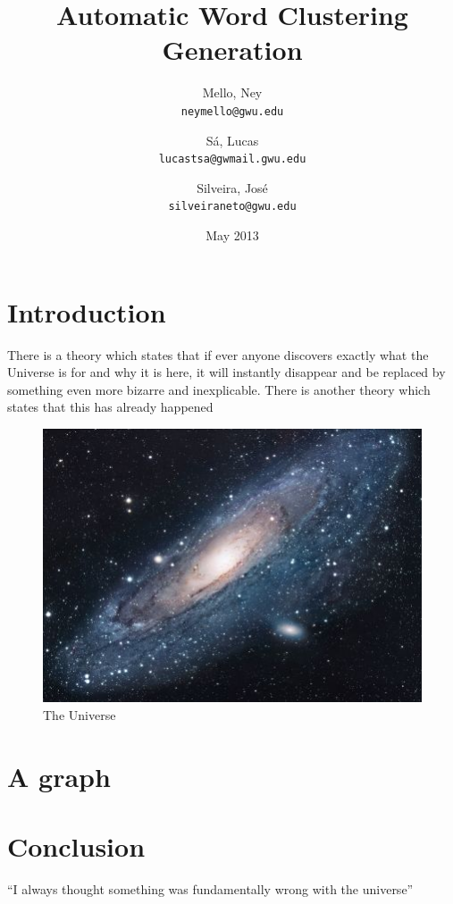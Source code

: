 \documentclass{article}
\title{Automatic Word Clustering Generation}
\author{
  Mello, Ney\\
  \texttt{neymello@gwu.edu}
  \and
  Sá, Lucas\\
  \texttt{lucastsa@gwmail.gwu.edu}
  \and
  Silveira, José\\
  \texttt{silveiraneto@gwu.edu}
}
\date{May 2013}
\begin{document}
\maketitle

\section{Introduction}
There is a theory which states that if ever anyone discovers exactly what
 the Universe is for and why it is here, 
it will instantly disappear and be replaced by something even more bizarre 
and inexplicable. \citep{kowalski2011information}
There is another theory which states that this has already happened

\begin{figure}[h!]
\centering
\includegraphics[scale=1.7]{universe.jpg}
\caption{The Universe}
\label{threadsVsSync}
\end{figure}

\section{A graph}

\section{Conclusion}
``I always thought something was fundamentally wrong with the universe'' \citep{adams1995hitchhiker}



\end{document}
